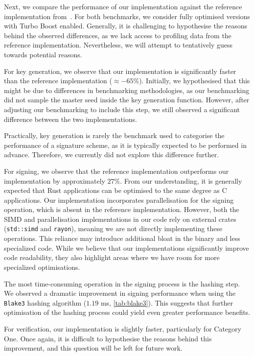 \documentclass[11pt]{report}
\theoremstyle{definition}
\theoremstyle{plain}
\begin{document}
Next, we compare the performance of our implementation against the reference implementation from~\cite{aguilarsyndrome11}. For both benchmarks, we consider fully optimised versions with Turbo Boost enabled. Generally, it is challenging to hypothesise the reasons behind the observed differences, as we lack access to profiling data from the reference implementation. Nevertheless, we will attempt to tentatively guess towards potential reasons.

For key generation, we observe that our implementation is significantly faster than the reference implementation ($\approx -65\%$). Initially, we hypothesised that this might be due to differences in benchmarking methodologies, as our benchmarking did not sample the master seed inside the key generation function. However, after adjusting our benchmarking to include this step, we still observed a significant difference between the two implementations.

Practically, key generation is rarely the benchmark used to categorise the performance of a signature scheme, as it is typically expected to be performed in advance. Therefore, we currently did not explore this difference further.

For signing, we observe that the reference implementation outperforms our implementation by approximately $27\%$. From our understanding, it is generally expected that Rust applications can be optimised to the same degree as C applications. Our implementation incorporates parallelisation for the signing operation, which is absent in the reference implementation. However, both the SIMD and parallelisation implementations in our code rely on external crates (\texttt{std::simd} and \texttt{rayon}), meaning we are not directly implementing these operations. This reliance may introduce additional bloat in the binary and less specialized code. While we believe that our implementations significantly improve code readability, they also highlight areas where we have room for more specialized optimisations.

The most time-consuming operation in the signing process is the hashing step. We observed a dramatic improvement in signing performance when using the \texttt{Blake3} hashing algorithm ($1.19$ ms, \autoref{tab:blake3}). This suggests that further optimisation of the hashing process could yield even greater performance benefits.

For verification, our implementation is slightly faster, particularly for Category One. Once again, it is difficult to hypothesise the reasons behind this improvement, and this question will be left for future work.
\end{document}
